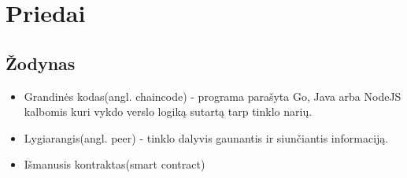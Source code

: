 \documentclass{VUMIFPSkursinis}
\begin{document}
\pagebreak

\section{Priedai}
\subsection{Žodynas}
\begin{itemize}
	\item{Grandinės kodas(angl. chaincode) - programa parašyta Go, Java arba NodeJS kalbomis kuri vykdo
 verslo logiką sutartą tarp tinklo narių.}
	\item{Lygiarangis(angl. peer) - tinklo dalyvis gaunantis ir siunčiantis informaciją.}
	\item{Išmanusis kontraktas(smart contract)}
\end{itemize}


\printbibliography[heading=bibintoc]  
\end{document}
